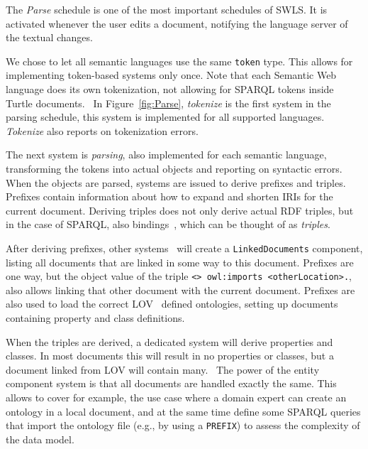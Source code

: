 The \textit{Parse} schedule is one of the most important schedules of SWLS.
It is activated whenever the user edits a document, notifying the language server of the textual changes.

We chose to let all semantic languages use the same \texttt{token} type. 
This allows for implementing token-based systems only once.
Note that each Semantic Web language does its own tokenization, not allowing for SPARQL tokens inside Turtle documents.~
In Figure~\ref{fig:Parse}, \textit{tokenize} is the first system in the parsing schedule, this system is implemented for all supported languages. \textit{Tokenize} also reports on tokenization errors.

The next system is \textit{parsing}, also implemented for each semantic language, transforming the tokens into actual objects and reporting on syntactic errors. 
When the objects are parsed, systems are issued to derive prefixes and triples. 
Prefixes contain information about how to expand and shorten IRIs for the current document.
Deriving triples does not only derive actual RDF triples, but in the case of SPARQL, also bindings~, which can be thought of as \textit{triples}.

After deriving prefixes, other systems~ will create a \texttt{LinkedDocuments} component, listing all documents that are linked in some way to this document.
Prefixes are one way, but the object value of the triple \texttt{<> owl:imports <otherLocation>.}, also allows linking that other document with the current document.
Prefixes are also used to load the correct LOV~\cite{LOV2017} defined ontologies, setting up documents containing property and class definitions.~

When the triples are derived, a dedicated system will derive properties and classes.
In most documents this will result in no properties or classes, but a document linked from LOV will contain many.~
The power of the entity component system is that all documents are handled exactly the same.
This allows to cover for example, the use case where a domain expert can create an ontology in a local document, and at the same time define some SPARQL queries that import the ontology file (e.g., by using a \texttt{PREFIX}) to assess the complexity of the data model.

